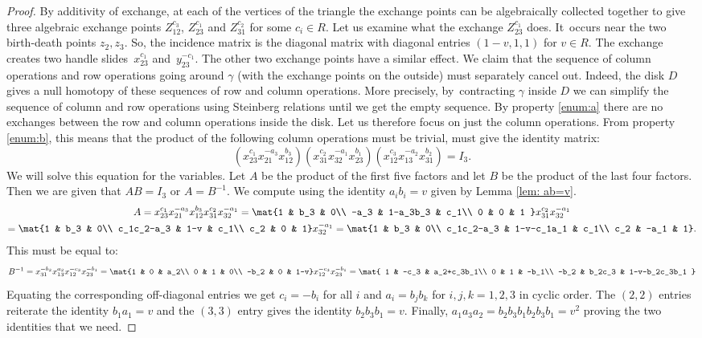 \begin{proof}
By additivity of exchange, at each of the vertices of the triangle the exchange points can be algebraically collected together to give three algebraic exchange points $Z_{12}^{c_3}$, $Z_{23}^{c_1}$ and $Z_{31}^{c_2}$ for some $c_i\in R$.
Let us examine what the exchange $Z_{23}^{c_1}$ does. It~occurs near the two birth-death points $z_2,z_3$. So, the incidence matrix is the diagonal matrix with diagonal entries $(1-v,1,1)$ for $v\in R$. The exchange creates two handle slides~$x_{23}^{c_1}$ and~$y_{23}^{-c_1}$. The other two exchange points have a similar effect. We claim that the sequence of column operations and row operations going around $\gamma$ (with the exchange points on the outside) must separately cancel out. Indeed, the disk $D$ gives a null homotopy of these sequences of row and column operations. More precisely, by~contracting $\gamma$ inside $D$ we can simplify the sequence of column and row operations using Steinberg relations until we get the empty sequence. By property \eqref{enum:a} there are no exchanges between the row and column operations inside the disk. Let us therefore focus on just the column operations. From property \eqref{enum:b}, this means that the product of the following column operations must be trivial, \ie must give the identity matrix:
\[
(x_{23}^{c_1}x_{21}^{-a_3}x_{12}^{b_3})
(x_{31}^{c_2}x_{32}^{-a_1}x_{23}^{b_1})
(x_{12}^{c_3}x_{13}^{-a_2}x_{31}^{b_2})=I_3.
\]
We will solve this equation for the variables. Let $A$ be the product of the first five factors and let $B$ be the product of the last four factors. Then we are given that $AB=I_3$ or $A=B^{-1}$. We compute using the identity $a_ib_i=v$ given by Lemma \ref{lem: ab=v}.
\begin{multline*}
\arraycolsep4.5pt
A=x_{23}^{c_1}x_{21}^{-a_3}x_{12}^{b_3}x_{31}^{c_2}x_{32}^{-a_1}=\mat{1 & b_3 & 0\\
-a_3 & 1-a_3b_3 & c_1\\
0 & 0 & 1
}x_{31}^{c_2}x_{32}^{-a_1}
\\ \arraycolsep4.5pt
= \mat{1 & b_3 & 0\\
c_1c_2-a_3 & 1-v & c_1\\
c_2 & 0 & 1}x_{32}^{-a_1}
= \mat{1 & b_3 & 0\\
c_1c_2-a_3 & 1-v-c_1a_1 & c_1\\
c_2 & -a_1 & 1}.
\end{multline*}
This must be equal to:
\[\arraycolsep3.5pt
B^{-1}=x_{31}^{-b_2}x_{13}^{a_2}x_{12}^{-c_3}x_{23}^{-b_1}=\mat{1 & 0 & a_2\\
0 & 1 & 0\\
-b_2 & 0 & 1-v}x_{12}^{-c_3}x_{23}^{-b_1}
= \mat{
1 & -c_3 & a_2+c_3b_1\\
0 & 1 & -b_1\\
-b_2 & b_2c_3 & 1-v-b_2c_3b_1
}
\]
Equating the corresponding off-diagonal entries we get $c_i=-b_i$ for all $i$ and $a_i=b_jb_k$ for $i,j,k=1,2,3$ in cyclic order. The $(2,2)$ entries reiterate the identity $b_1a_1=v$ and the $(3,3)$ entry gives the identity $b_2b_3b_1=v$. Finally, $a_1a_3a_2=b_2b_3b_1b_2b_3b_1=v^2$ proving the two identities that we need.


\end{proof}
